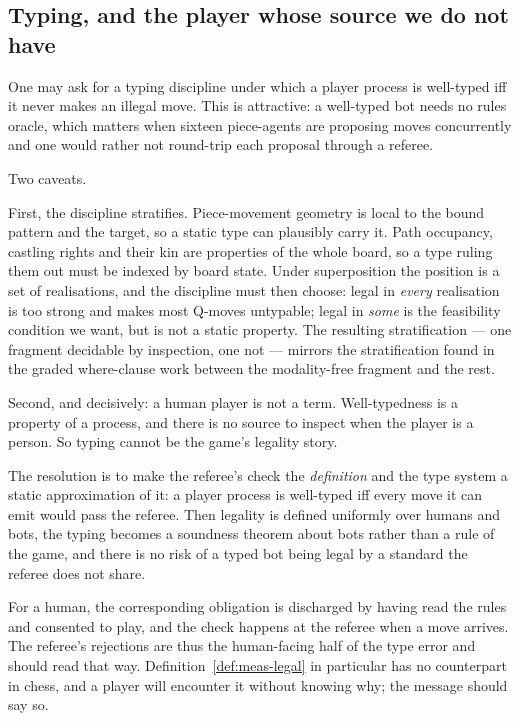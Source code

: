 \documentclass[11pt,a4paper]{article}
\theoremstyle{definition}
\theoremstyle{plain}
\begin{document}
\subsection{Typing, and the player whose source we do not have}

One may ask for a typing discipline under which a player process is well-typed
iff it never makes an illegal move. This is attractive: a well-typed bot needs
no rules oracle, which matters when sixteen piece-agents are proposing moves
concurrently and one would rather not round-trip each proposal through a
referee.

Two caveats.

First, the discipline stratifies. Piece-movement geometry is local to the bound
pattern and the target, so a static type can plausibly carry it. Path
occupancy, castling rights and their kin are properties of the whole board, so
a type ruling them out must be indexed by board state. Under superposition the
position is a set of realisations, and the discipline must then choose: legal
in \emph{every} realisation is too strong and makes most Q-moves untypable;
legal in \emph{some} is the feasibility condition we want, but is not a static
property. The resulting stratification --- one fragment decidable by
inspection, one not --- mirrors the stratification found in the graded
where-clause work between the modality-free fragment and the rest.

Second, and decisively: a human player is not a term. Well-typedness is a
property of a process, and there is no source to inspect when the player is a
person. So typing cannot be the game's legality story.

The resolution is to make the referee's check the \emph{definition} and the
type system a static approximation of it: a player process is well-typed iff
every move it can emit would pass the referee. Then legality is defined
uniformly over humans and bots, the typing becomes a soundness theorem about
bots rather than a rule of the game, and there is no risk of a typed bot being
legal by a standard the referee does not share.

For a human, the corresponding obligation is discharged by having read the
rules and consented to play, and the check happens at the referee when a move
arrives. The referee's rejections are thus the human-facing half of the type
error and should read that way. Definition~\ref{def:meas-legal} in particular
has no counterpart in chess, and a player will encounter it without knowing
why; the message should say so.
\end{document}
